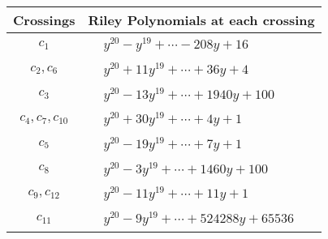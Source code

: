 \documentclass[1p]{elsarticle_modified}
\theoremstyle{definition}
\begin{document}
\begin{tabular}{m{50pt}|m{274pt}}
Crossings & \hspace{64pt}Riley Polynomials at each crossing \\
\hline $$\begin{aligned}c_{1}\end{aligned}$$&$\begin{aligned}
&y^{20}- y^{19}+\cdots-208 y+16
\end{aligned}$\\
\hline $$\begin{aligned}c_{2},c_{6}\end{aligned}$$&$\begin{aligned}
&y^{20}+11 y^{19}+\cdots+36 y+4
\end{aligned}$\\
\hline $$\begin{aligned}c_{3}\end{aligned}$$&$\begin{aligned}
&y^{20}-13 y^{19}+\cdots+1940 y+100
\end{aligned}$\\
\hline $$\begin{aligned}c_{4},c_{7},c_{10}\end{aligned}$$&$\begin{aligned}
&y^{20}+30 y^{19}+\cdots+4 y+1
\end{aligned}$\\
\hline $$\begin{aligned}c_{5}\end{aligned}$$&$\begin{aligned}
&y^{20}-19 y^{19}+\cdots+7 y+1
\end{aligned}$\\
\hline $$\begin{aligned}c_{8}\end{aligned}$$&$\begin{aligned}
&y^{20}-3 y^{19}+\cdots+1460 y+100
\end{aligned}$\\
\hline $$\begin{aligned}c_{9},c_{12}\end{aligned}$$&$\begin{aligned}
&y^{20}-11 y^{19}+\cdots+11 y+1
\end{aligned}$\\
\hline $$\begin{aligned}c_{11}\end{aligned}$$&$\begin{aligned}
&y^{20}-9 y^{19}+\cdots+524288 y+65536
\end{aligned}$\\
\hline
\end{tabular}\\~\\
\end{document}
